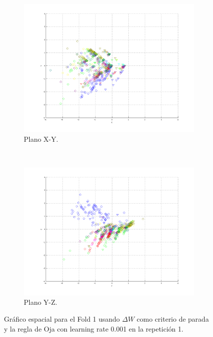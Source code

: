 \documentclass[informe.tex]{subfiles}
\begin{document}
\begin{figure}[H]
        \hspace*{-6.5cm}
        \begin{subfigure}[b]{0.49\textwidth}
                \includegraphics[width=\textwidth]{graficos/fold1_criterioParadap_reglaM_alpha0_rep1_2XY.png}
                \caption{Plano X-Y.}
        \end{subfigure}
        ~
        \begin{subfigure}[b]{0.49\textwidth}
                \includegraphics[width=\textwidth]{graficos/fold1_criterioParadap_reglaM_alpha0_rep1_3YZ.png}
                \caption{Plano Y-Z.}
        \end{subfigure}
	\restoregeometry
        \caption{Gráfico espacial para el Fold 1 usando $\Delta W$ como criterio de parada y la regla de Oja con learning rate 0.001 en la repetición 1.}
        \label{fig:fold1_criterioParadap_reglaM_alpha0_rep1}
	\end{figure}
      
\end{document}
